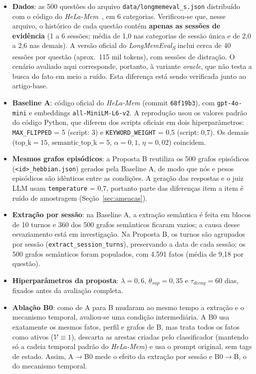\documentclass[10pt,conference,twocolumn]{IEEEtran}
\begin{document}
\begin{itemize}
    \item \textbf{Dados}: as 500 questões do arquivo \texttt{data/longmemeval\_s.json} distribuído com o código do \textit{HeLa-Mem}~\cite{longmemeval2025}, em 6 categorias. Verificou-se que, nesse arquivo, o histórico de cada questão contém \textbf{apenas as sessões de evidência} (1 a 6 sessões; média de 1,0 nas categorias de sessão única e de 2,0 a 2,6 nas demais). A versão oficial do \textit{LongMemEval\textsubscript{S}} inclui cerca de 40 sessões por questão (aprox.\ 115 mil tokens), com sessões de distração. O cenário avaliado aqui corresponde, portanto, à variante \textit{oracle}, que não testa a busca do fato em meio a ruído. Esta diferença está sendo verificada junto ao artigo-base.
    \item \textbf{Baseline A}: código oficial do \textit{HeLa-Mem} (commit \texttt{68f19b3}), com \texttt{gpt-4o-mini} e embeddings \texttt{all-MiniLM-L6-v2}. A reprodução usou os valores padrão do código Python, que diferem dos scripts oficiais em dois hiperparâmetros: \texttt{MAX\_FLIPPED} = 5 (script: 3) e \texttt{KEYWORD\_WEIGHT} = 0,5 (script: 0,7). Os demais ($\text{top\_k}=15$, $\text{semantic\_top\_k}=5$, $\alpha=0{,}1$, $\eta=0{,}02$) coincidem.
    \item \textbf{Mesmos grafos episódicos}: a Proposta B reutiliza os 500 grafos episódicos (\texttt{<id>\_hebbian.json}) gerados pela Baseline A, de modo que nós e pesos episódicos são idênticos entre as condições. A geração das respostas e o juiz LLM usam \texttt{temperature} = 0,7, portanto parte das diferenças item a item é ruído de amostragem (Seção~\ref{sec:ameacas}).
    \item \textbf{Extração por sessão}: na Baseline A, a extração semântica é feita em blocos de 10 turnos e 360 dos 500 grafos semânticos ficaram vazios; a causa desse esvaziamento está em investigação. Na Proposta B, os turnos são agrupados por sessão (\texttt{extract\_session\_turns}), preservando a data de cada sessão; os 500 grafos semânticos foram populados, com 4.591 fatos (média de 9,18 por questão).
    \item \textbf{Hiperparâmetros da proposta}: $\lambda=0{,}6$, $\theta_{sup}=0{,}35$ e $\tau_{decay}=60$ dias, fixados antes da avaliação completa.
    \item \textbf{Ablação B0}: como de A para B mudaram ao mesmo tempo a extração e o mecanismo temporal, avaliou-se uma condição intermediária. A B0 usa exatamente os mesmos fatos, perfil e grafos de B, mas trata todos os fatos como ativos ($\mathcal{V} \equiv 1$), descarta as arestas criadas pelo classificador (mantendo só a cadeia temporal padrão do \textit{HeLa-Mem}) e usa o prompt original, sem tags de estado. Assim, A$\rightarrow$B0 mede o efeito da extração por sessão e B0$\rightarrow$B, o do mecanismo temporal.
\end{itemize}
\end{document}
